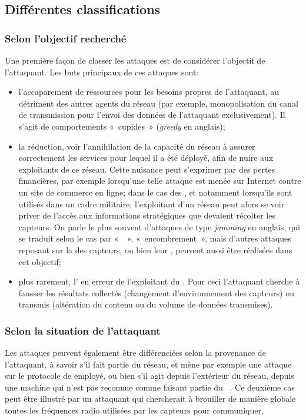 \subsection{Différentes classifications}

    \subsubsection{Selon l'objectif recherché}
Une première façon de classer les attaques est de considérer l'objectif de l'attaquant.
Les buts principaux de ces attaques sont:
\begin{itemize}
    \item l'accaparement de ressources pour les besoins propres de l'attaquant, au détriment des autres agents du réseau (par exemple, monopolisation du canal de transmission pour l'envoi des données de l'attaquant exclusivement). Il s'agit de comportements « cupides » (\textit{greedy} en anglais);
    \item la réduction, voir l'annihilation de la capacité du réseau à assurer correctement les services pour lequel il a été déployé, afin de nuire aux exploitants de ce réseau. Cette nuisance peut s'exprimer par des pertes financières, par exemple lorsqu'une telle attaque est menée sur Internet contre un site de commerce en ligne; dans le cas des \rcsfs, et notamment lorsqu'ils sont utilisés dans un cadre militaire, l'exploitant d'un réseau peut alors se voir priver de l'accès aux informations stratégiques que devaient récolter les capteurs. On parle le plus souvent d'attaques de type \textit{jamming} en anglais, qui se traduit selon le cas par «  », « encombrement », mais d'autres attaques reposant sur la  des capteurs, ou bien leur , peuvent aussi être réalisées dans cet objectif;
    \item plus rarement, l' en erreur de l'exploitant du \rc. Pour ceci l'attaquant cherche à fausser les résultats collectés (changement d'environnement des capteurs) ou transmis (altération du contenu ou du volume de données transmises).
\end{itemize}

    \subsubsection{Selon la situation de l'attaquant}
    Les attaques peuvent également être différenciées selon la provenance de l'attaquant, à savoir s'il fait partie du réseau, et mène par exemple une attaque sur le protocole de  employé, ou bien s'il agit depuis l'extérieur du réseau, depuis une machine qui n'est pas reconnue comme faisant partie du \rc~\cite{SZFDXC14}.
Ce deuxième cas peut être illustré par un attaquant qui chercherait à brouiller de manière globale toutes les fréquences radio utilisées par les capteurs pour communiquer.


